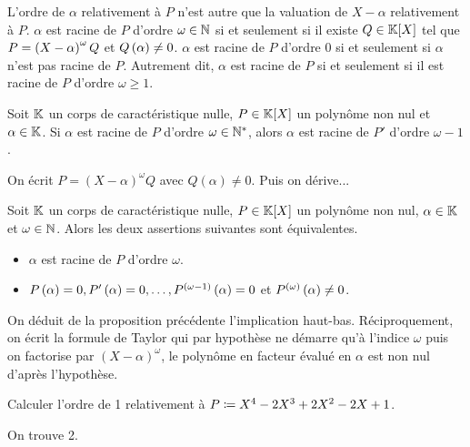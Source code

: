 \documentclass{magnolia}
\begin{document}
\begin{remarques}
\remarque L'ordre de $\alpha$ relativement à $P$ n'est autre que la valuation de $X-\alpha$ relativement à $P$.
\remarque $\alpha$ est racine de $P$ d'ordre $\omega\in\mathbb{N}$ si
  et seulement si il existe $Q\in\polyK$ tel que $P=\left(X-\alpha\right)^\omega Q$ et
  $Q\left(\alpha\right)\neq 0$.
\remarque $\alpha$ est racine de $P$ d'ordre 0 si et seulement si $\alpha$ n'est pas racine
  de $P$. Autrement dit, $\alpha$ est racine de $P$ si et seulement si il est racine
  de $P$ d'ordre $\omega\geq 1$.
\end{remarques}

\begin{proposition}
Soit $\mathbb{K}$ un corps de caractéristique nulle, $P\in\polyK$ un polynôme non nul et $\alpha\in\mathbb{K}$. Si $\alpha$ est racine de $P$
d'ordre $\omega\in{\mathbb{N}^*}$, alors $\alpha$ est racine de $P'$ d'ordre $\omega-1$.
\end{proposition}

\begin{preuve}
On écrit $P=(X-\alpha)^\omega Q$ avec $Q(\alpha)\neq 0$. Puis on dérive...
\end{preuve}

\begin{proposition}
Soit $\mathbb{K}$ un corps de caractéristique nulle, $P\in\polyK$ un polynôme non nul,
$\alpha\in\mathbb{K}$ et $\omega\in\mathbb{N}$. Alors les
deux assertions suivantes sont équivalentes.
\begin{itemize}
\item $\alpha$ est racine de $P$ d'ordre $\omega$.
\item $P\left(\alpha\right)=0,P'\left(\alpha\right)=0,\ldots,P^{(\omega-1)}\left(\alpha\right)=0$ et
  $P^{(\omega)}\left(\alpha\right)\neq 0$.
\end{itemize}
\end{proposition}

\begin{preuve}
On déduit de la proposition précédente l'implication haut-bas.
Réciproquement, on écrit la formule de Taylor qui par hypothèse ne démarre qu'à l'indice $\omega$ puis on factorise par $(X-\alpha)^\omega$, le polynôme en facteur évalué en $\alpha$ est non nul d'après l'hypothèse.
\end{preuve}

\begin{exoUnique}
\exo Calculer l'ordre de 1 relativement à $P\coloneqq X^4-2X^3+2X^2-2X+1$.
  \begin{sol}
  On trouve 2.
  \end{sol}  
\end{exoUnique}
\end{document}
